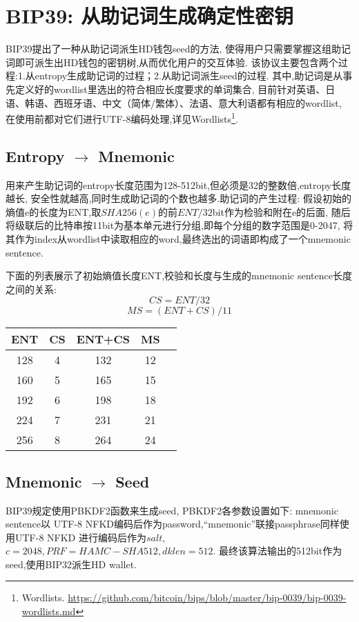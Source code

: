 \section{BIP39: 从助记词生成确定性密钥}

BIP39提出了一种从助记词派生HD钱包seed的方法,
使得用户只需要掌握这组助记词即可派生出HD钱包的密钥树,从而优化用户的交互体验.  
该协议主要包含两个过程:1.从entropy生成助记词的过程；2.从助记词派生seed的过程.
其中,助记词是从事先定义好的wordlist里选出的符合相应长度要求的单词集合,
目前针对英语、日语、韩语、西班牙语、中文（简体/繁体）、法语、意大利语都有相应的wordlist,
在使用前都对它们进行UTF-8编码处理,详见Wordlists\footnote{Wordlists. 
\url{https://github.com/bitcoin/bips/blob/master/bip-0039/bip-0039-wordlists.md}}.


\subsection{Entropy $\rightarrow$ Mnemonic}
用来产生助记词的entropy长度范围为128-512bit,但必须是32的整数倍,entropy长度越长,
安全性就越高,同时生成助记词的个数也越多.助记词的产生过程:
假设初始的熵值e的长度为ENT,取$SHA256(e)$的前$ENT/32$bit作为检验和附在e的后面,
随后将级联后的比特串按11bit为基本单元进行分组,即每个分组的数字范围是0-2047,
将其作为index从wordlist中读取相应的word,最终选出的词语即构成了一个mnemonic sentence.

下面的列表展示了初始熵值长度ENT,校验和长度与生成的mnemonic sentence长度之间的关系:
		$$CS = ENT / 32$$
		$$MS = (ENT + CS) / 11$$
\begin{table}
\centering
\begin{tabular}{|c|c|c|c|c|}
\hline
\small
ENT &  CS  &   ENT+CS  &  MS  \\\hline
128 &  4  &  132 &  12  \\\hline
160 &  5  &  165 &  15 \\\hline
192 &  6  &  198 &  18 \\\hline
224  &  7  &  231 &  21 \\\hline
256  &  8  &  264 &  24 \\\hline
\end{tabular}
\end{table}

\subsection{Mnemonic $\rightarrow$ Seed}
BIP39规定使用PBKDF2函数来生成seed, PBKDF2各参数设置如下:
mnemonic sentence以 UTF-8 NFKD编码后作为password,“mnemonic”联接passphrase同样使用UTF-8 NFKD
进行编码后作为$salt$,$c=2048, PRF=HAMC-SHA512, dklen=512$.
最终该算法输出的512bit作为 seed,使用BIP32派生HD wallet.


